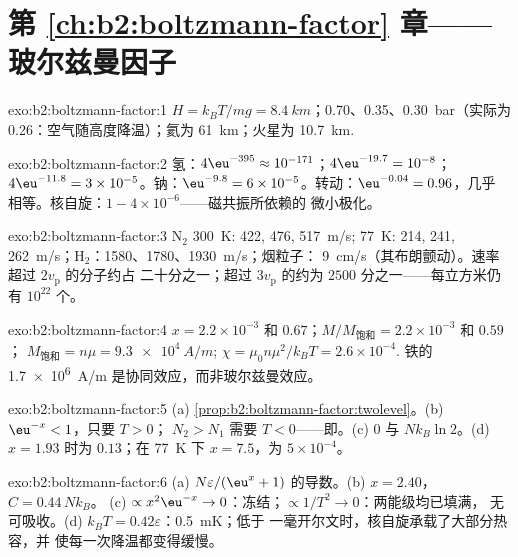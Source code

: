 \section*{第 \ref{ch:b2:boltzmann-factor} 章——玻尔兹曼因子}

\begin{solution}{exo:b2:boltzmann-factor:1}
$H = k_BT/mg = \qty{8.4}{km}$；\qty{0.70}{}、\qty{0.35}{}、\qty{0.30}{bar}（实际为
\qty{0.26}{}：空气随高度降温）；氦为 \qty{61}{km}；火星为
\qty{10.7}{km}.
\end{solution}

\begin{solution}{exo:b2:boltzmann-factor:2}
氢：$4\eu^{-395} \approx 10^{-171}$；$4\eu^{-19.7} = 10^{-8}$；$4\eu^{-11.8} = 3 \times
10^{-5}$。钠：$\eu^{-9.8} = 6 \times 10^{-5}$。转动：$\eu^{-0.04} = 0.96$，几乎
相等。核自旋：$1 - 4 \times 10^{-6}$——磁共振所依赖的
微小极化。
\end{solution}

\begin{solution}{exo:b2:boltzmann-factor:3}
N$_2$ \qty{300}{K}: \qty{422}{}, \qty{476}{}, \qty{517}{m/s}; \qty{77}{K}: \qty{214}{}, \qty{241}{},
\qty{262}{m/s}；H$_2$：\qty{1580}{}、\qty{1780}{}、\qty{1930}{m/s}；烟粒子：
\qty{9}{cm/s}（其布朗颤动）。速率超过 $2v_{\text{p}}$ 的分子约占
二十分之一；超过 $3v_{\text{p}}$ 的约为 $2500$ 分之一——每立方米仍有 $10^{22}$ 个。
\end{solution}

\begin{solution}{exo:b2:boltzmann-factor:4}
$x = 2.2 \times 10^{-3}$ 和 $0.67$；$M/M_{\text{饱和}} = 2.2 \times 10^{-3}$ 和 $0.59$；
$M_{\text{饱和}} = n\mu = \qty{9.3e4}{A/m}$; $\chi = \mu_0n\mu^2/k_BT = 2.6 \times 10^{-4}$.
铁的 \qty{1.7e6}{A/m} 是协同效应，而非玻尔兹曼效应。
\end{solution}

\begin{solution}{exo:b2:boltzmann-factor:5}
(a) \cref{prop:b2:boltzmann-factor:twolevel}。(b) $\eu^{-x} < 1$，只要 $T > 0$；
$N_2 > N_1$ 需要 $T < 0$——即。(c) $0$ 与
$Nk_B\ln 2$。(d) $x = 1.93$ 时为 $0.13$；在 \qty{77}{K} 下 $x = 7.5$，为 $5 \times 10^{-4}$。
\end{solution}

\begin{solution}{exo:b2:boltzmann-factor:6}
(a) $N\varepsilon/(\eu^x + 1)$ 的导数。(b) $x = 2.40$，$C = 0.44\,Nk_B$。
(c) $\propto x^2\eu^{-x} \to 0$：冻结；$\propto 1/T^2 \to 0$：两能级均已填满，
无可吸收。(d) $k_BT = 0.42\varepsilon$：\qty{0.5}{mK}；低于
一毫开尔文时，核自旋承载了大部分热容，并
使每一次降温都变得缓慢。
\end{solution}


